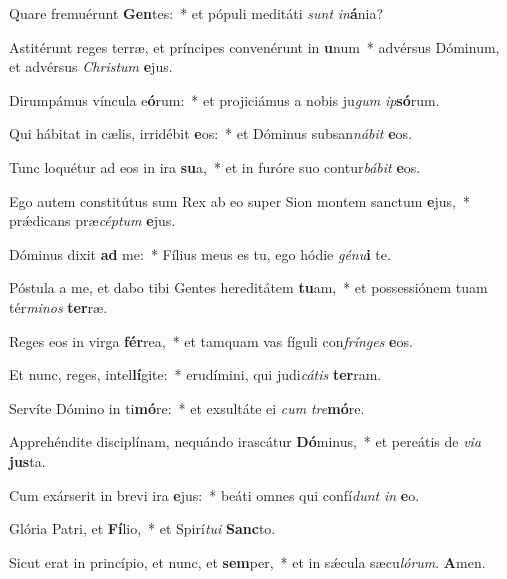 \item Quare fremuérunt \textbf{Gen}tes:~* et pópuli meditáti \textit{sunt} \textit{in}\textbf{á}nia?
\item Astitérunt reges terræ, et príncipes convenérunt in \textbf{u}num~* advérsus Dóminum, et advérsus \textit{Chris}\textit{tum} \textbf{e}jus.
\item Dirumpámus víncula e\textbf{ó}rum:~* et projiciámus a nobis ju\textit{gum} \textit{ip}\textbf{só}rum.
\item Qui hábitat in cælis, irridébit \textbf{e}os:~* et Dóminus subsan\textit{ná}\textit{bit} \textbf{e}os.
\item Tunc loquétur ad eos in ira \textbf{su}a,~* et in furóre suo contur\textit{bá}\textit{bit} \textbf{e}os.
\item Ego autem constitútus sum Rex ab eo super Sion montem sanctum \textbf{e}jus,~* prǽdicans præ\textit{cép}\textit{tum} \textbf{e}jus.
\item Dóminus dixit \textbf{ad} me:~* Fílius meus es tu, ego hódie \textit{gé}\textit{nu}\textbf{i} te.
\item Póstula a me, et dabo tibi Gentes hereditátem \textbf{tu}am,~* et possessiónem tuam tér\textit{mi}\textit{nos} \textbf{ter}ræ.
\item Reges eos in virga \textbf{fér}rea,~* et tamquam vas fíguli con\textit{frín}\textit{ges} \textbf{e}os.
\item Et nunc, reges, intel\textbf{lí}gite:~* erudímini, qui judi\textit{cá}\textit{tis} \textbf{ter}ram.
\item Servíte Dómino in ti\textbf{mó}re:~* et exsultáte ei \textit{cum} \textit{tre}\textbf{mó}re.
\item Apprehéndite disciplínam, nequándo irascátur \textbf{Dó}minus,~* et pereátis de \textit{vi}\textit{a} \textbf{jus}ta.
\item Cum exárserit in brevi ira \textbf{e}jus:~* beáti omnes qui confí\textit{dunt} \textit{in} \textbf{e}o.
\item Glória Patri, et \textbf{Fí}lio,~* et Spirí\textit{tu}\textit{i} \textbf{Sanc}to.
\item Sicut erat in princípio, et nunc, et \textbf{sem}per,~* et in sǽcula sæcu\textit{ló}\textit{rum}. \textbf{A}men.
